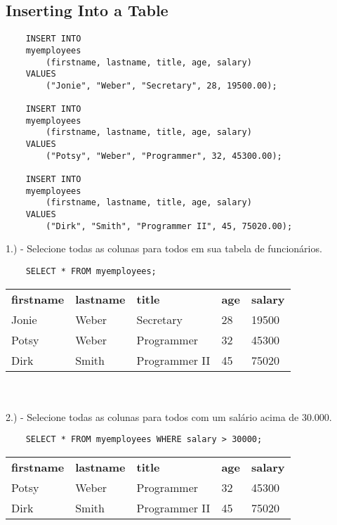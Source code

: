 \subsection{Inserting Into a Table}

\begin{lstlisting}
    INSERT INTO 
    myemployees
        (firstname, lastname, title, age, salary)
    VALUES 
        ("Jonie", "Weber", "Secretary", 28, 19500.00);

    INSERT INTO 
    myemployees
        (firstname, lastname, title, age, salary)
    VALUES 
        ("Potsy", "Weber", "Programmer", 32, 45300.00);
    
    INSERT INTO 
    myemployees
        (firstname, lastname, title, age, salary)
    VALUES 
        ("Dirk", "Smith", "Programmer II", 45, 75020.00);
\end{lstlisting}

1.) - Selecione todas as colunas para todos em sua tabela de funcionários.

\begin{lstlisting}
    SELECT * FROM myemployees;
\end{lstlisting}

\begin{tabular}{l l l l l}
    {\textbf{firstname}} & {\textbf{lastname}} & {\textbf{title}} & {\textbf{age}} & {\textbf{salary}} \\
    {Jonie}              & {Weber}             & {Secretary}      & {28}           & {19500}           \\
    {Potsy}              & {Weber}             & {Programmer}     & {32}           & {45300}           \\
    {Dirk}               & {Smith}             & {Programmer II}  & {45}           & {75020}          
\end{tabular} \\ \\

2.) - Selecione todas as colunas para todos com um salário acima de 30.000.

\begin{lstlisting}
    SELECT * FROM myemployees WHERE salary > 30000;
\end{lstlisting}

\begin{tabular}{l l l l l}
    {\textbf{firstname}} & {\textbf{lastname}} & {\textbf{title}} & {\textbf{age}} & {\textbf{salary}} \\
    {Potsy}              & {Weber}             & {Programmer}     & {32}           & {45300}           \\
    {Dirk}               & {Smith}             & {Programmer II}  & {45}           & {75020}          
\end{tabular} \\ \\

